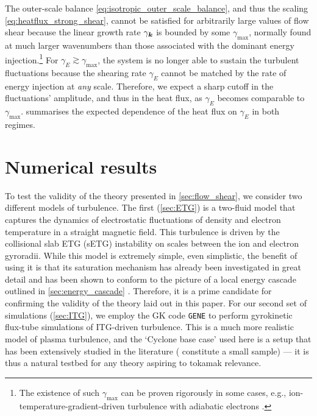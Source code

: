 \documentclass{jpp}
\newcommand{\gammaE}{\gamma_{E}}
\begin{document}
The outer-scale balance \cref{eq:isotropic_outer_scale_balance}, and thus the scaling \cref{eq:heatflux_strong_shear}, cannot be satisfied for arbitrarily large values of flow shear because the linear growth rate \(\gamma_{\boldsymbol{k}}\) is bounded by some \(\gamma_\text{max}\), normally found at much larger wavenumbers than those associated with the dominant energy injection.\footnote{The existence of such \(\gamma_\text{max}\) can be proven rigorously in some cases, e.g., ion-temperature-gradient-driven turbulence with adiabatic electrons \citep{helander22}.} For \(\gammaE \gtrsim \gamma_\text{max}\), the system is no longer able to sustain the turbulent fluctuations because the shearing rate \(\gammaE\) cannot be matched by the rate of energy injection at \textit{any} scale. Therefore, we expect a sharp cutoff in the fluctuations' amplitude, and thus in the heat flux, as \(\gammaE\) becomes comparable to \(\gamma_\text{max}\).  summarises the expected dependence of the heat flux on \(\gammaE\) in both regimes.

\section{Numerical results}
\label{sec:numerical_results}


To test the validity of the theory presented in \cref{sec:flow_shear}, we consider two different models of turbulence. The first (\cref{sec:ETG}) is a two-fluid model that captures the dynamics of electrostatic fluctuations of density and electron temperature in a straight magnetic field. This turbulence is driven by the collisional slab ETG (sETG) instability \citep{adkins22} on scales between the ion and electron gyroradii. While this model is extremely simple, even simplistic, the benefit of using it is that its saturation mechanism has already been investigated in great detail and has been shown to conform to the picture of a local energy cascade outlined in \cref{sec:energy_cascade} \citep{adkins23}. Therefore, it is a prime candidate for confirming the validity of the theory laid out in this paper. For our second set of simulations (\cref{sec:ITG}), we employ the GK code \texttt{GENE} \citep{jenko00, jenko00GENE} to perform gyrokinetic flux-tube simulations of ITG-driven turbulence. This is a much more realistic model of plasma turbulence, and the `Cyclone base case' used here is a setup that has been extensively studied in the literature (\citealt{lin99,dimits00, barnes09, highcock12, peeters16, li21, ajay21, volcokas22, hoffmann23,lippert23,tirkas23} constitute a small sample) --- it is thus a natural testbed for any theory aspiring to tokamak relevance.
\end{document}
